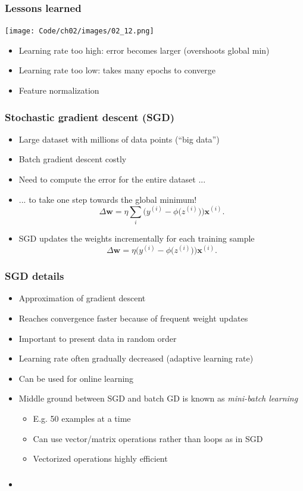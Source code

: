 \documentclass{beamer}
\begin{document}
\begin{frame}
  \frametitle{Lessons learned}
  \texttt{[image: Code/ch02/images/02\_12.png]}
  \begin{itemize}
  \item Learning rate too high: error becomes larger (overshoots global min)
  \item Learning rate too low: takes many epochs to converge
    \item Feature normalization
  \end{itemize}
\end{frame}

\begin{frame}
  \frametitle{Stochastic gradient descent (SGD)}
  \begin{itemize}
  \item Large dataset with millions of data points (``big data'')
  \item Batch gradient descent costly
  \item Need to compute the error for the entire dataset ...
  \item ... to take one step towards the global minimum!
    \[
    \Delta \mathbf{w} = \eta \sum_i \bigg( y^{(i)} - \phi \big( z^{(i)}\big) \bigg) \mathbf{x}^{(i)}.
    \]
  \item SGD updates the weights incrementally for each training sample
    \[
    \Delta \mathbf{w} = \eta  \bigg( y^{(i)} - \phi \big( z^{(i)}\big) \bigg) \mathbf{x}^{(i)}.
    \]
  \end{itemize}
\end{frame}

\begin{frame}
  \frametitle{SGD details}
  \begin{itemize}
  \item Approximation of gradient descent
  \item Reaches convergence faster because of frequent weight updates
  \item Important to present data in random order
  \item Learning rate often gradually decreased (adaptive learning rate)
  \item Can be used for online learning
  \item Middle ground between SGD and batch GD is known as \emph{mini-batch learning}
    \begin{itemize}
    \item E.g. 50 examples at a time
    \item Can use vector/matrix operations rather than loops as in SGD
    \item Vectorized operations highly efficient
    \end{itemize}
  \end{itemize}
\end{frame}

\begin{frame}
  \frametitle{}
  \begin{itemize}
  \item
  \end{itemize}
\end{frame}
\end{document}

